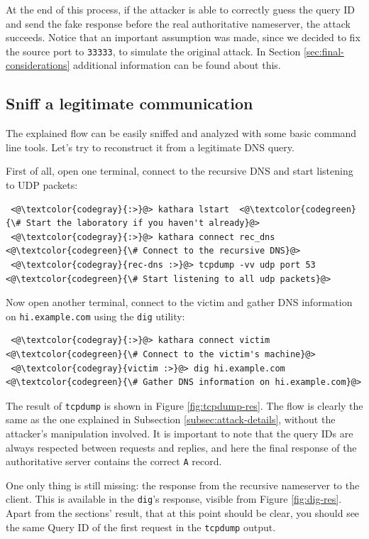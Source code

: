 \documentclass[11pt,a4paper]{article}
\begin{document}
\noindent
At the end of this process, if the attacker is able to correctly guess the query ID and send the fake response before the real authoritative nameserver, the attack succeeds. Notice that an important assumption was made, since we decided to fix the source port to \texttt{33333}, to simulate the original attack. In Section \ref{sec:final-considerations} additional information can be found about this.



\subsection{Sniff a legitimate communication}
The explained flow can be easily sniffed and analyzed with some basic command line tools. Let's try to reconstruct it from a legitimate DNS query.

First of all, open one terminal, connect to the recursive DNS and start listening to UDP packets:
\begin{lstlisting}
 <@\textcolor{codegray}{:>}@> kathara lstart  <@\textcolor{codegreen}{\# Start the laboratory if you haven't already}@>
 <@\textcolor{codegray}{:>}@> kathara connect rec_dns <@\textcolor{codegreen}{\# Connect to the recursive DNS}@>
 <@\textcolor{codegray}{rec-dns :>}@> tcpdump -vv udp port 53    <@\textcolor{codegreen}{\# Start listening to all udp packets}@>
\end{lstlisting}

Now open another terminal, connect to the victim and gather DNS information on \texttt{hi.example.com} using the \texttt{dig} utility:
\begin{lstlisting}
 <@\textcolor{codegray}{:>}@> kathara connect victim <@\textcolor{codegreen}{\# Connect to the victim's machine}@>
 <@\textcolor{codegray}{victim :>}@> dig hi.example.com    <@\textcolor{codegreen}{\# Gather DNS information on hi.example.com}@>
\end{lstlisting}

The result of \texttt{tcpdump} is shown in Figure \ref{fig:tcpdump-res}. The flow is clearly the same as the one explained in Subsection \ref{subsec:attack-details}, without the attacker's manipulation involved. It is important to note that the query IDs are always respected between requests and replies, and here the final response of the authoritative server contains the correct \texttt{A} record.

One only thing is still missing: the response from the recursive nameserver to the client. This is available in the \texttt{dig}'s response, visible from Figure \ref{fig:dig-res}. Apart from the sections' result, that at this point should be clear, you should see the same Query ID of the first request in the \texttt{tcpdump} output.
\end{document}
